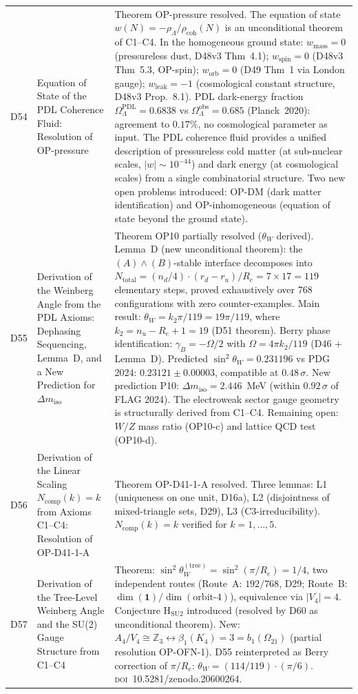 \documentclass[11pt,a4paper]{article}
\theoremstyle{plain}
\theoremstyle{definition}
\theoremstyle{remark}
\newcommand{\Kfour}{K_4}
\newcommand{\rhocoh}{\rho_{\mathrm{coh}}}
\begin{document}
\begin{longtable}{L{1.3cm}L{3.8cm}L{8.0cm}}
D54 & Equation of State of the PDL Coherence Fluid: Resolution of OP-pressure~\cite{D54} & \textcolor{proofblue}{Theorem} OP-pressure resolved. The equation of state $w(N) = -\rho_\Lambda/\rhocoh(N)$ is an unconditional theorem of C1--C4. In the homogeneous ground state: $w_{\mathrm{mass}} = 0$ (pressureless dust, D48v3 Thm~4.1); $w_{\mathrm{spin}} = 0$ (D48v3 Thm~5.3, OP-spin); $w_{\mathrm{orb}} = 0$ (D49 Thm~1 via London gauge); $w_{\mathrm{leak}} = -1$ (cosmological constant structure, D48v3 Prop.~8.1). PDL dark-energy fraction $\Omega_\Lambda^{\mathrm{PDL}} = 0.6838$ vs $\Omega_\Lambda^{\mathrm{obs}} = 0.685$ (Planck~2020): agreement to $0.17\%$, no cosmological parameter as input. The PDL coherence fluid provides a unified description of pressureless cold matter (at sub-nuclear scales, $|w|\sim 10^{-44}$) and dark energy (at cosmological scales) from a single combinatorial structure. Two new open problems introduced: OP-DM (dark matter identification) and OP-inhomogeneous (equation of state beyond the ground state).\\[0.4em]
D55 & Derivation of the Weinberg Angle from the PDL Axioms: Dephasing Sequencing, Lemma~D, and a New Prediction for $\Delta m_{\mathrm{iso}}$~\cite{D55} & \textcolor{proofblue}{Theorem} OP10 partially resolved ($\theta_W$ derived). Lemma~D (new unconditional theorem): the $(A)\wedge(B)$-stable interface decomposes into $N_{\mathrm{total}} = (n_d/4)\cdot(r_d-r_u)/R_e = 7\times 17 = 119$ elementary steps, proved exhaustively over 768 configurations with zero counter-examples. Main result: $\theta_W = k_2\pi/119 = 19\pi/119$, where $k_2 = n_u - R_e + 1 = 19$ (D51 theorem). Berry phase identification: $\gamma_B = -\Omega/2$ with $\Omega = 4\pi k_2/119$ (D46 + Lemma~D). Predicted $\sin^2\theta_W = 0.231196$ vs PDG 2024: $0.23121 \pm 0.00003$, compatible at $0.48\,\sigma$. New prediction P10: $\Delta m_{\mathrm{iso}} = 2.446$~MeV (within $0.92\,\sigma$ of FLAG 2024). The electroweak sector gauge geometry is structurally derived from C1--C4. Remaining open: $W/Z$ mass ratio (OP10-c) and lattice QCD test (OP10-d).\\[0.4em]
D56 & Derivation of the Linear Scaling $N_{\mathrm{comp}}(k)=k$ from Axioms C1--C4: Resolution of OP-D41-1-A~\cite{D56} & \textcolor{proofblue}{Theorem} OP-D41-1-A resolved. Three lemmas: L1 (uniqueness on one unit, D16a), L2 (disjointness of mixed-triangle sets, D29), L3 (C3-irreducibility). $N_{\mathrm{comp}}(k)=k$ verified for $k=1,\ldots,5$.\\[0.4em]
D57 & Derivation of the Tree-Level Weinberg Angle and the SU(2) Gauge Structure from C1--C4~\cite{D57} & \textcolor{proofblue}{Theorem}: $\sin^2\theta_W^{(\mathrm{tree})} = \sin^2(\pi/R_e) = 1/4$, two independent routes (Route~A: $192/768$, D29; Route~B: $\dim(\mathbf{1})/\dim(\text{orbit-4})$), equivalence via $|V_4|=4$. \textcolor{conjecturegreen}{Conjecture} H$_{\mathrm{SU2}}$ introduced (resolved by D60 as unconditional theorem). New: $A_4/V_4 \cong \mathbb{Z}_3 \leftrightarrow \beta_1(\Kfour)=3=b_1(\Omega_{21})$ (partial resolution OP-OFN-1). D55 reinterpreted as Berry correction of $\pi/R_e$: $\theta_W = (114/119)\cdot(\pi/6)$. \textsc{doi}~10.5281/zenodo.20600264.\\[0.4em]

\end{longtable}
\end{document}
